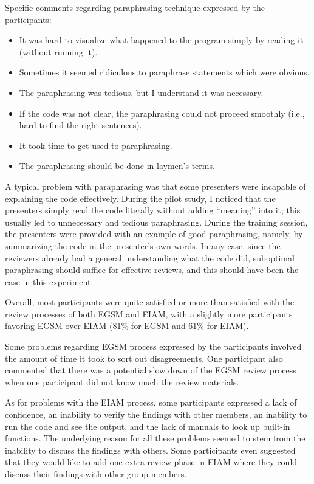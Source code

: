 Specific comments regarding paraphrasing technique expressed by the
participants:  
\begin{itemize}
\item It was hard to visualize what happened to the program simply by
reading it (without running it). 
\item Sometimes it seemed ridiculous to paraphrase statements which
were obvious. 
\item The paraphrasing was tedious, but I understand it was necessary.
\item If the code was not clear, the paraphrasing could not proceed
smoothly (i.e., hard to find the right sentences).
\item It took time to get used to paraphrasing.
\item The paraphrasing should be done in laymen's terms.
\end{itemize}

A typical problem with paraphrasing was that some presenters were
incapable of explaining the code effectively.
During the pilot study, I noticed that the presenters simply read the
code literally without adding ``meaning'' into it; this usually
led to unnecessary and tedious paraphrasing.
During the training session, the presenters were provided with an
example of good paraphrasing, namely, by summarizing the code in
the presenter's own words. 
In any case, since the reviewers 
already had a general understanding what the code did, 
suboptimal paraphrasing should suffice for effective reviews,
and this should have been the case in this experiment.

Overall, most participants were quite satisfied or more than satisfied
with the review processes of both EGSM and EIAM,
with a slightly more participants favoring EGSM over EIAM  (81\% for
EGSM and 61\% for EIAM). 

Some problems regarding EGSM process expressed by the participants
involved the amount of time it took to sort out
disagreements. One participant also commented that there was
a potential slow down of the EGSM review
process when one participant did not know much the review materials. 

As for problems with the EIAM process, some participants expressed
a lack of confidence, an inability to verify the findings with other
members, an inability to run the code and see the output, and the lack of 
manuals to look up built-in functions.
The underlying reason for all these problems seemed to stem from the
inability to discuss the findings with others.
Some participants even suggested that they would like
to add one extra review phase in EIAM where they could discuss their
findings with other group members. 

